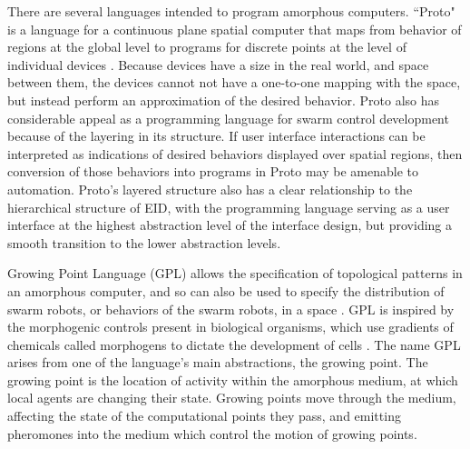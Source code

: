 There are several languages intended to program amorphous computers. 
``Proto" is a language for a continuous plane spatial computer that maps from behavior of regions at the global level to programs for discrete points at the level of individual devices \citep{beal2006infrastructure}. 
Because devices have a size in the real world, and space between them, the devices cannot not have a one-to-one mapping with the space, but instead perform an approximation of the desired behavior. 
Proto also has considerable appeal as a programming language for swarm control development because of the layering in its structure. 
If user interface interactions can be interpreted as indications of desired behaviors displayed over spatial regions, then conversion of those behaviors into programs in Proto may be amenable to automation. 
Proto's layered structure also has a clear relationship to the hierarchical structure of EID, with the programming language serving as a user interface at the highest abstraction level of the interface design, but providing a smooth transition to the lower abstraction levels.  

Growing Point Language (GPL) allows the specification of topological patterns in an amorphous computer, and so can also be used to specify the distribution of swarm robots, or behaviors of the swarm robots, in a space \citep{nagpal2004engineering}. 
GPL is inspired by the morphogenic controls present in biological organisms, which use gradients of chemicals called morphogens to dictate the development of cells \citep{turing1952chemical}.
The name GPL arises from one of the language's main abstractions, the growing point. 
The growing point is the location of activity within the amorphous medium, at which local agents are changing their state. 
Growing points move through the medium, affecting the state of the computational points they pass, and emitting pheromones into the medium which control the motion of growing points.

